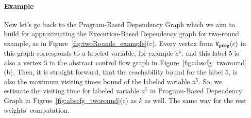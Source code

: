 \paragraph*{Example}
Now let's 
go back to the Program-Based Dependency Graph which we aim to build for approximating the 
Execution-Based Dependency graph for two-round example, as in
Figure~\ref{fig:twoRounds_example}(c).
%
Every vertex from $\mathtt{{V_{prog}}}(c)$ in this graph corresponds to a labeled variable, for example $a^5$,
and this label $5$ is also a vertex $5$ in the abstract control flow graph in Figure~\ref{fig:abscfg_tworound}(b).
%
Then, it is straight forward, 
that the reachability bound for the label $5$, 
is also the maximum visiting times bound of the labeled variable $a^5$.
So, we estimate the visiting time for  labeled variable $a^5$ in Program-Based Dependency Graph in Figrue~\ref{fig:abscfg_tworound}(c) as $k$ as well.
%
The same way for the rest weights' computation.
%
